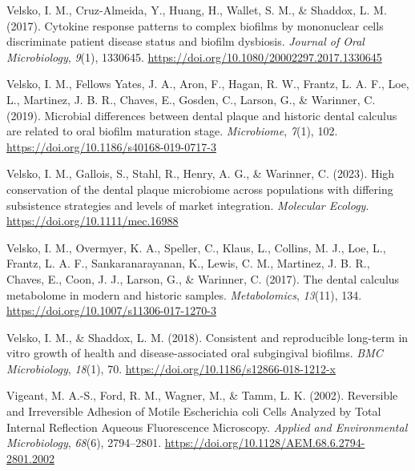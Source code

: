 \documentclass[
  letterpaper,
]{book}
\newlength{\cslhangindent}
\newlength{\cslentryspacingunit} %
\newenvironment{CSLReferences}[2] %
 {%
  \setlength{\parindent}{0pt}
  \ifodd #1
  \let\oldpar\par
  \def\par{\hangindent=\cslhangindent\oldpar}
  \fi
  \setlength{\parskip}{#2\cslentryspacingunit}
 }%
 {}
\begin{document}
\begin{CSLReferences}{1}{0}
\leavevmode{}%
Velsko, I. M., Cruz-Almeida, Y., Huang, H., Wallet, S. M., \& Shaddox,
L. M. (2017). Cytokine response patterns to complex biofilms by
mononuclear cells discriminate patient disease status and biofilm
dysbiosis. \emph{Journal of Oral Microbiology}, \emph{9}(1), 1330645.
\url{https://doi.org/10.1080/20002297.2017.1330645}

\leavevmode{}%
Velsko, I. M., Fellows Yates, J. A., Aron, F., Hagan, R. W., Frantz, L.
A. F., Loe, L., Martinez, J. B. R., Chaves, E., Gosden, C., Larson, G.,
\& Warinner, C. (2019). Microbial differences between dental plaque and
historic dental calculus are related to oral biofilm maturation stage.
\emph{Microbiome}, \emph{7}(1), 102.
\url{https://doi.org/10.1186/s40168-019-0717-3}

\leavevmode{}%
Velsko, I. M., Gallois, S., Stahl, R., Henry, A. G., \& Warinner, C.
(2023). High conservation of the dental plaque microbiome across
populations with differing subsistence strategies and levels of market
integration. \emph{Molecular Ecology}.
\url{https://doi.org/10.1111/mec.16988}

\leavevmode{}%
Velsko, I. M., Overmyer, K. A., Speller, C., Klaus, L., Collins, M. J.,
Loe, L., Frantz, L. A. F., Sankaranarayanan, K., Lewis, C. M., Martinez,
J. B. R., Chaves, E., Coon, J. J., Larson, G., \& Warinner, C. (2017).
The dental calculus metabolome in modern and historic samples.
\emph{Metabolomics}, \emph{13}(11), 134.
\url{https://doi.org/10.1007/s11306-017-1270-3}

\leavevmode{}%
Velsko, I. M., \& Shaddox, L. M. (2018). Consistent and reproducible
long-term in vitro growth of health and disease-associated oral
subgingival biofilms. \emph{BMC Microbiology}, \emph{18}(1), 70.
\url{https://doi.org/10.1186/s12866-018-1212-x}

\leavevmode{}%
Vigeant, M. A.-S., Ford, R. M., Wagner, M., \& Tamm, L. K. (2002).
Reversible and {Irreversible Adhesion} of {Motile Escherichia} coli
{Cells Analyzed} by {Total Internal Reflection Aqueous Fluorescence
Microscopy}. \emph{Applied and Environmental Microbiology},
\emph{68}(6), 2794--2801.
\url{https://doi.org/10.1128/AEM.68.6.2794-2801.2002}


\end{CSLReferences}
\end{document}
